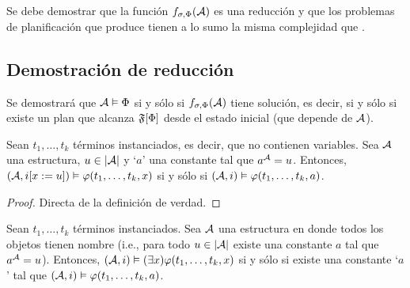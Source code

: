 Se debe demostrar que la función $f_{\sigma,\Phi}(\mathcal{A})$ es una reducción y que
los problemas de planificación que produce tienen a lo sumo la misma
complejidad que \SOE.

\subsection{Demostración de reducción}
Se demostrará que $\mathcal{A} \vDash \Phi$ si y sólo si $f_{\sigma,\Phi}(\mathcal{A})$ tiene
solución, es decir, si y sólo si existe un plan que alcanza $\mathfrak{F}[\Phi]$ desde
el estado inicial (que depende de $\mathcal{A}$).

\begin{proposition}
\label{t1}
Sean $t_1,\ldots,t_k$ términos instanciados, es decir, que no contienen
variables. Sea $\mathcal{A}$ una estructura, $u\in|\mathcal{A}|$ y `$a$' una constante tal que
$a^{\mathcal{A}}=u$.
Entonces, $(\mathcal{A}, i[x:=u]) \vDash \varphi(t_1,\ldots,t_k,x)$ si y sólo si
$(\mathcal{A}, i) \vDash \varphi(t_1,\ldots,t_k,a)$.
\end{proposition}
\begin{proof}
Directa de la definición de verdad.
\end{proof}
\begin{corollary}
\label{corolario}
Sean $t_1,\ldots,t_k$ términos instanciados. Sea $\mathcal{A}$ una
estructura en donde todos los objetos tienen nombre (i.e., para todo $u\in|\mathcal{A}|$
existe una constante $a$ tal que $a^{\mathcal{A}}=u$). Entonces,
$(\mathcal{A}, i) \vDash (\exists x) \varphi(t_1,\ldots,t_k,x)$ si y sólo si
existe una constante `$a$' tal que $(\mathcal{A}, i) \vDash \varphi(t_1,\ldots,t_k,a)$.
\end{corollary}

